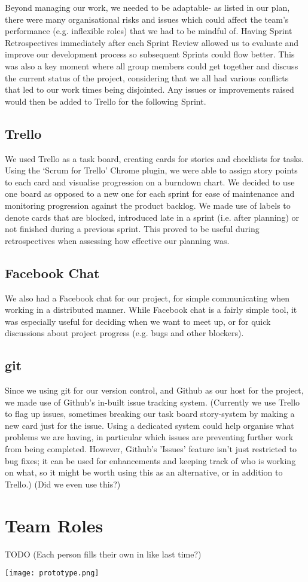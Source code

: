 Beyond managing our work, we needed to be adaptable- as listed in our plan, there were many organisational risks and issues which could affect the team's performance (e.g. inflexible roles) that we had to be mindful of. Having Sprint Retrospectives immediately after each Sprint Review allowed us to evaluate and improve our development process so subsequent Sprints could flow better. This was also a key moment where all group members could get together and discuss the current status of the project, considering that we all had various conflicts that led to our work times being disjointed. Any issues or improvements raised would then be added to Trello for the following Sprint.

\subsection{Trello}
We used Trello as a task board, creating cards for stories and checklists for tasks. Using the `Scrum for Trello' Chrome plugin, we were able to assign story points to each card and visualise progression on a burndown chart. We decided to use one board as opposed to a new one for each sprint for ease of maintenance and monitoring progression against the product backlog. We made use of labels to denote cards that are blocked, introduced late in a sprint (i.e. after planning) or not finished during a previous sprint. This proved to be useful during retrospectives when assessing how effective our planning was.

\subsection{Facebook Chat}
We also had a Facebook chat for our project, for simple communicating when working in a distributed manner. While Facebook chat is a fairly simple tool, it was especially useful for deciding when we want to meet up, or for quick discussions about project progress (e.g. bugs and other blockers).

\subsection{git}
Since we using git for our version control, and Github as our host for the project, we made use of Github's in-built issue tracking system. (Currently we use Trello to flag up issues, sometimes breaking our task board story-system by making a new card just for the issue. Using a dedicated system could help organise what problems we are having, in particular which issues are preventing further work from being completed. However, Github's 'Issues' feature isn't just restricted to bug fixes; it can be used for enhancements and keeping track of who is working on what, so it might be worth using this as an alternative, or in addition to Trello.) (Did we even use this?)

\section{Team Roles}
TODO (Each person fills their own in like last time?)

\begin{center}
\texttt{[image: prototype.png]}
\end{center}
